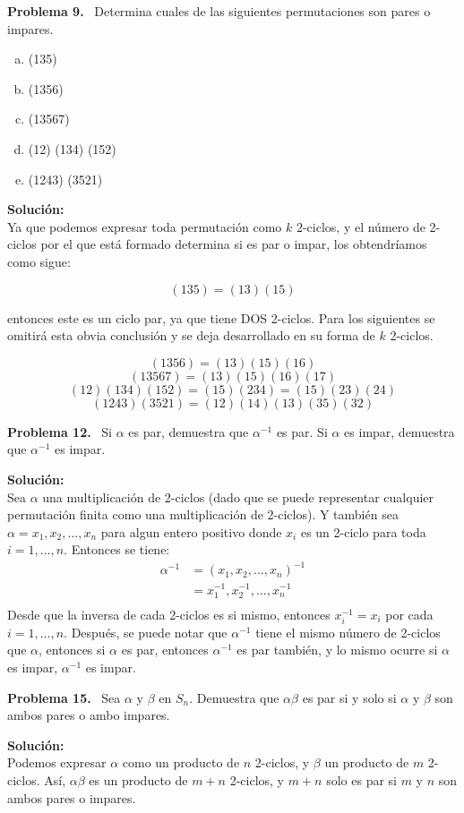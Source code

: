 \documentclass{article}
\newcounter{problem}
\newcounter{solution}
\newcommand\Problem[1]{%
  \stepcounter{problem}%
  \textbf{Problema #1.}~%
  \setcounter{solution}{0}%
}
\newcommand\TheSolution{%
  \textbf{Solución:}\\%
}
\begin{document}
\Problem{9} Determina cuales de las siguientes permutaciones son pares o
impares.
\begin{enumerate}[a.]
	\item (135)
  \item (1356)
  \item (13567)
  \item (12) (134) (152)
  \item (1243) (3521)
\end{enumerate}

\TheSolution{}
Ya que podemos expresar toda permutación como $k$ 2-ciclos, y el número de
2-ciclos por el que está formado determina si es par o impar, los obtendríamos
como sigue:

\[
  (135)=(13)(15)
\]

entonces este es un ciclo par, ya que tiene DOS 2-ciclos. Para los siguientes
se omitirá esta obvia conclusión y se deja desarrollado en su forma de $k$
2-ciclos.

\[{(1356)} = {(13)}{(15)}{(16)}\]
\[(13567) = (13)(15)(16)(17)\]
\[(12)(134)(152) = (15)(234)=(15)(23)(24)\]
\[(1243)(3521) = (12)(14)(13)(35)(32)\]

\Problem{12} Si $\alpha$ es par, demuestra que $\alpha^{-1}$ es par. Si
$\alpha$ es impar, demuestra que $\alpha^{-1}$ es impar.

\TheSolution{}
Sea $\alpha$ una multiplicación de 2-ciclos (dado que se puede representar
cualquier permutaci\'on finita como una multiplicación de 2-ciclos). Y también
sea $\alpha = x_1,x_2,\dots,x_n$ para algun entero positivo donde $x_i$ es un
2-ciclo para toda $i=1,\dots,n$. Entonces se tiene:\\
		\begin{align*}
      \alpha^{-1} &= {(x_1,x_2,\dots,x_n)}^{-1}\\
			&= x_1^{-1}, x_2^{-1},\dots,x_n^{-1}\\
		\end{align*}
Desde que la inversa de cada 2-ciclos es si mismo, entonces $x_i^{-1} = x_i$
por cada $i=1,\dots,n$. Despu\'es, se puede notar que $\alpha^{-1}$ tiene el
mismo n\'umero de 2-ciclos que $\alpha$, entonces si $\alpha$ es par, entonces
$\alpha^{-1}$ es par tambi\'en, y lo mismo ocurre si $\alpha$ es impar,
$\alpha^{-1}$ es impar.

\Problem{15} Sea $\alpha$ y $\beta$ en $S_n$. Demuestra que $\alpha\beta$ es
par si y solo si $\alpha$ y $\beta$ son ambos pares o ambo impares.

\TheSolution{} Podemos expresar $\alpha$ como un producto de $n$ 2-ciclos, y
$\beta$ un producto de $m$ 2-ciclos. Así, $\alpha\beta$ es un producto de
$m + n$ 2-ciclos, y $m + n$ solo es par si $m$ y $n$ son ambos pares o
impares.
\end{document}
